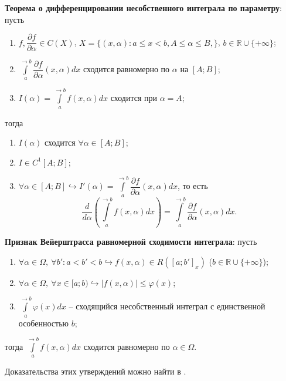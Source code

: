 \documentclass[12pt, a4paper, reqno]{article}
\begin{document}
    \textbf{Теорема о дифференцировании несобственного интеграла по параметру}: пусть
    \begin{enumerate}
        \item $f, \dfrac{\partial f}{\partial\alpha} \in C(X)$,
              $X = \{(x, \alpha): a \leq x < b, A \leq \alpha \leq B,\}$,
              $b \in \mathbb{R} \cup \{+\infty\}$;
        \item $\int\limits_{a}^{\to b} \dfrac{\partial f}{\partial\alpha}(x, \alpha)dx$ сходится
              равномерно по $\alpha$ на $[A; B]$;
        \item $I(\alpha) = \int\limits_{a}^{\to b} f(x, \alpha)dx$ сходится при $\alpha = A$;
    \end{enumerate}
    тогда
    \begin{enumerate}
        \item $I(\alpha)$ сходится $\forall \alpha \in [A; B]$;
        \item $I \in C^1[A; B]$;
        \item $\forall \alpha \in [A; B] \hookrightarrow I'(\alpha) =
               \int\limits_{a}^{\to b} \dfrac{\partial f}{\partial\alpha}(x, \alpha)dx$, то есть
            \begin{equation*}
                \frac{d}{d\alpha}\left(\int\limits_{a}^{\to b} f(x, \alpha)dx\right) =
                \int\limits_{a}^{\to b} \frac{\partial f}{\partial\alpha}(x, \alpha)dx.
            \end{equation*}
    \end{enumerate}

    \textbf{Признак Вейерштрасса равномерной сходимости интеграла}: пусть
    \begin{enumerate}
        \item $\forall \alpha \in \Omega,\ \forall b': a < b' < b \hookrightarrow
              f(x, \alpha) \in R([a; b']_x)$ ($b \in \mathbb{R} \cup \{+\infty\}$);
        \item $\forall \alpha \in \Omega,\ \forall x \in [a; b) \hookrightarrow
              |f(x, \alpha)| \leq \varphi(x)$;
        \item $\int\limits_{a}^{\to b} \varphi(x)dx$ -- сходящийся несобственный интеграл с
              единственной особенностью $b$;
    \end{enumerate}
    тогда $\int\limits_{a}^{\to b} f(x, \alpha)dx$ сходится равномерно по $\alpha \in \Omega$.

    Доказательства этих утверждений можно найти в \cite{petrovich-3}.
\end{document}
